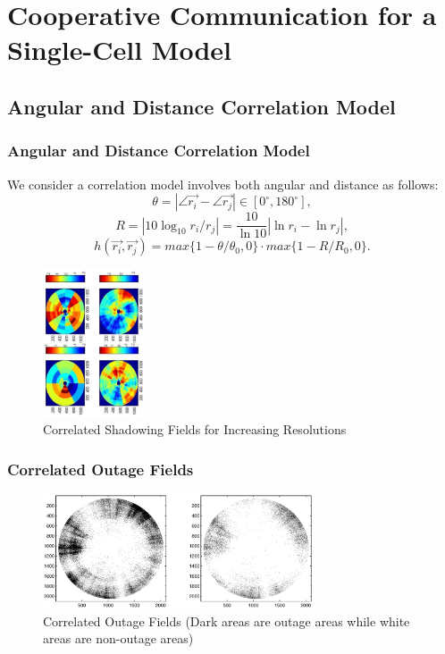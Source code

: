 \documentclass{beamer}
\begin{document}
\section{Cooperative Communication for a Single-Cell Model}
\subsection{Angular and Distance Correlation Model}
\begin{frame}
\frametitle{Angular and Distance Correlation Model}
We consider a correlation model involves both angular and distance as follows:
\begin{equation}
\theta = |\angle\vec{r_{i}}-\angle\vec{r_{j}}|\in [0^{\circ},180^{\circ}],
\end{equation}
\begin{equation}
R=|10\log_{10}r_{i}/r_{j}|=\frac{10}{\ln 10}|\ln r_{i}-\ln r_{j}|,
\end{equation}
\begin{equation}
h(\vec{r_{i}},\vec{r_{j}})=max\{1-\theta/\theta_{0},0\}\cdot max\{1-R/R_{0},0\}.
\end{equation}
\begin{figure}
\includegraphics[width=3cm, angle=270]{shadowingfield_V3.eps}
\caption{Correlated Shadowing Fields for Increasing Resolutions}
\end{figure}
\end{frame}
\begin{frame}
\frametitle{Correlated Outage Fields}
\begin{figure}
\centering
\includegraphics[width=8cm]{outagefield.eps}
\caption{Correlated Outage Fields (Dark areas are outage areas while white areas are non-outage areas)}
\label{outagefie}
\end{figure}
\end{frame}
%
\end{document}
